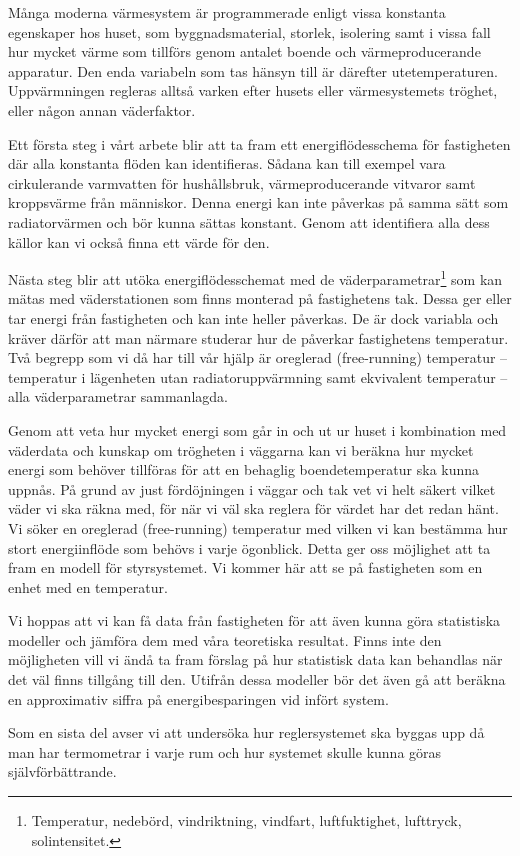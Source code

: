 Många moderna värmesystem är programmerade enligt vissa konstanta egenskaper hos huset, som byggnadsmaterial, storlek, isolering samt i vissa fall hur mycket värme som tillförs genom antalet boende och värmeproducerande apparatur. Den enda variabeln som tas hänsyn till är därefter utetemperaturen. Uppvärmningen regleras alltså varken efter husets eller värmesystemets tröghet, eller någon annan väderfaktor.

Ett första steg i vårt arbete blir att ta fram ett energiflödesschema för fastigheten där alla konstanta flöden kan identifieras. Sådana kan till exempel vara cirkulerande varmvatten för hushållsbruk, värmeproducerande vitvaror samt kroppsvärme från människor. Denna energi kan inte påverkas på samma sätt som radiatorvärmen och bör kunna sättas konstant. Genom att identifiera alla dess källor kan vi också finna ett värde för den.

Nästa steg blir att utöka energiflödesschemat med de väderparametrar\footnote{Temperatur, nedebörd, vindriktning, vindfart, luftfuktighet, lufttryck, solintensitet.} som kan mätas med väderstationen som finns monterad på fastighetens tak. Dessa ger eller tar energi från fastigheten och kan inte heller påverkas. De är dock variabla och kräver därför att man närmare studerar hur de påverkar fastighetens temperatur. Två begrepp som vi då har till vår hjälp är oreglerad (free-running) temperatur – temperatur i lägenheten utan radiatoruppvärmning samt ekvivalent temperatur – alla väderparametrar sammanlagda.

Genom att veta hur mycket energi som går in och ut ur huset i kombination med väderdata och kunskap om trögheten i väggarna kan vi beräkna hur mycket energi som behöver tillföras för att en behaglig boendetemperatur ska kunna uppnås. På grund av just fördöjningen i väggar och tak vet vi helt säkert vilket väder vi ska räkna med, för när vi väl ska reglera för värdet har det redan hänt. Vi söker en oreglerad (free-running) temperatur med vilken vi kan bestämma hur stort energiinflöde som behövs i varje ögonblick. Detta ger oss möjlighet att ta fram en modell för styrsystemet. Vi kommer här att se på fastigheten som en enhet med en temperatur.

Vi hoppas att vi kan få data från fastigheten för att även kunna göra statistiska modeller och jämföra dem med våra teoretiska resultat. Finns inte den möjligheten vill vi ändå ta fram förslag på hur statistisk data kan behandlas när det väl finns tillgång till den. Utifrån dessa modeller bör det även gå att beräkna en approximativ siffra på energibesparingen vid infört system.

Som en sista del avser vi att undersöka hur reglersystemet ska byggas upp då man har termometrar i varje rum och hur systemet skulle kunna göras självförbättrande.